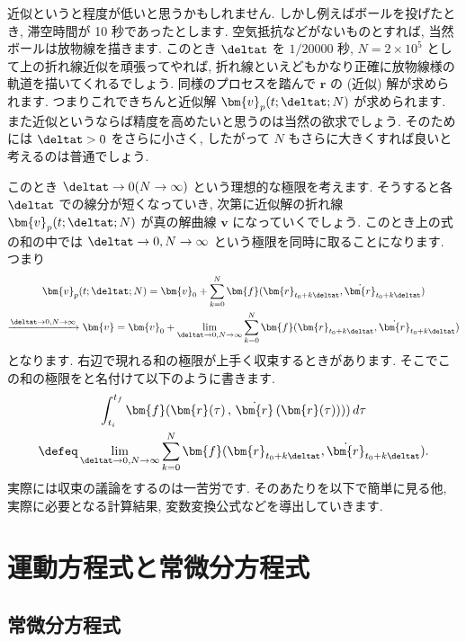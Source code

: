 \documentclass[openany, a4paper, oneside]{jsbook}
\begin{document}
近似というと程度が低いと思うかもしれません.
しかし例えばボールを投げたとき, 滞空時間が 10 秒であったとします.
空気抵抗などがないものとすれば, 当然ボールは放物線を描きます.
このとき $\deltat$ を $1/20000$ 秒,  $N=2 \times 10^5$ として上の折れ線近似を頑張ってやれば,
折れ線といえどもかなり正確に放物線様の軌道を描いてくれるでしょう.
同様のプロセスを踏んで $\bm{r}$ の (近似) 解が求められます.
つまりこれできちんと近似解 $\bm{v}_p ( t ; \deltat ;N)$ が求められます.
また近似というならば精度を高めたいと思うのは当然の欲求でしょう.
そのためには $\deltat>0$ をさらに小さく, したがって $N$ もさらに大きくすれば良いと考えるのは普通でしょう.

このとき $\deltat \to 0 ( N \to \infty)$ という理想的な極限を考えます.
そうすると各 $\deltat$ での線分が短くなっていき,
次第に近似解の折れ線 $\bm{v}_p ( t ; \deltat ; N )$ が真の解曲線 $\bm{v}$ になっていくでしょう.
このとき上の式の和の中では $\deltat \to 0 , N \to \infty$ という極限を同時に取ることになります.
つまり
\begin{gather}
\bm{v}_p ( t ; \deltat ; N )
=
\bm{v}_0 + \sum_{k=0}^N \bm{f} ( \bm{r}_{ t_0 + k \deltat } , \dot{ \bm{r} }_{t_0 + k \deltat} )\\
\xrightarrow{\deltat \to 0 , N \to \infty}
\bm{v}
=
\bm{v}_0 + \lim_{ \deltat \to 0 , N \to \infty }
\sum_{k=0}^N \bm{f} ( \bm{r}_{ t_0 + k \deltat } , \dot{ \bm{r} }_{t_0 + k \deltat} )
\end{gather}
となります.
右辺で現れる和の極限が上手く収束するときがあります.
そこでこの和の極限をと名付けて以下のように書きます.
\begin{gather}
\int _{t_i} ^{t_f}
\bm{f} ( \bm{r} (\tau ) \, , \, \dot{ \bm{r} } \, ( \bm{r} (\tau) ) ) ) \, d \tau  \\
\defeq
\lim_{ \deltat \to 0 , N \to \infty }
\sum_{k=0}^N \bm{f} ( \bm{r}_{ t_0 + k \deltat } , \dot{ \bm{r} }_{t_0 + k \deltat} ).
\end{gather}
実際には収束の議論をするのは一苦労です.
そのあたりを以下で簡単に見る他,
実際に必要となる計算結果, 変数変換公式などを導出していきます.
\section{運動方程式と常微分方程式}

\subsection{常微分方程式}
\end{document}
